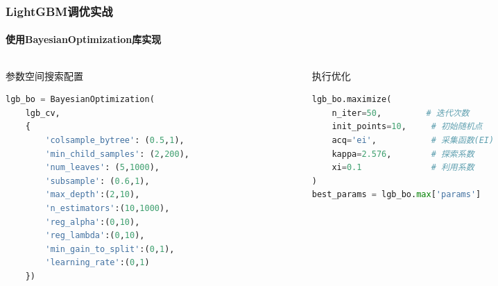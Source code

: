 \documentclass{ctexbeamer}
\begin{document}
\begin{frame}[fragile]
\frametitle{LightGBM调优实战}
\framesubtitle{使用BayesianOptimization库实现}
\scriptsize
\begin{columns}[T]
\begin{column}{0.5\textwidth}
\begin{block}{参数空间搜索配置}
\begin{lstlisting}[language=Python]
lgb_bo = BayesianOptimization(
    lgb_cv,
    {
        'colsample_bytree': (0.5,1),
        'min_child_samples': (2,200),
        'num_leaves': (5,1000),
        'subsample': (0.6,1),
        'max_depth':(2,10),
        'n_estimators':(10,1000),
        'reg_alpha':(0,10),
        'reg_lambda':(0,10),
        'min_gain_to_split':(0,1),
        'learning_rate':(0,1)
    })
\end{lstlisting}
\end{block}
\end{column}

\begin{column}{0.45\textwidth}
\begin{exampleblock}{执行优化}
\begin{lstlisting}[language=Python]
lgb_bo.maximize(
    n_iter=50,         # 迭代次数
    init_points=10,     # 初始随机点
    acq='ei',           # 采集函数(EI)
    kappa=2.576,        # 探索系数
    xi=0.1              # 利用系数
)
best_params = lgb_bo.max['params']
\end{lstlisting}
\end{exampleblock}
\end{column}
\end{columns}
\end{frame}
\end{document}
